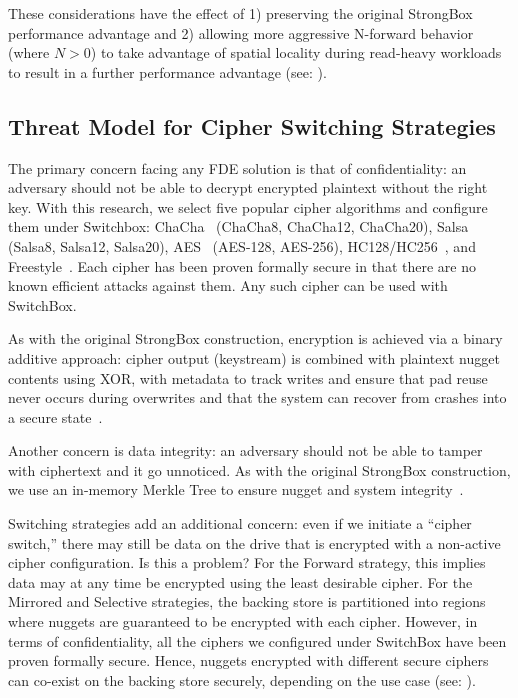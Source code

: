 These considerations have the effect of 1) preserving the original StrongBox
performance advantage and 2) allowing more aggressive N-forward behavior (where
$N > 0$) to take advantage of spatial locality during read-heavy workloads to
result in a further performance advantage (see: ).


\subsection{Threat Model for Cipher Switching Strategies}

The primary concern facing any FDE solution is that of confidentiality: an
adversary should not be able to decrypt encrypted plaintext without the right
key. With this research, we select five popular cipher algorithms and configure
them under Switchbox: ChaCha~\cite{ChaCha20} (ChaCha8, ChaCha12, ChaCha20),
Salsa~\cite{SalsaX} (Salsa8, Salsa12, Salsa20), AES~\cite{AES} (AES-128,
AES-256), HC128/HC256~\cite{HCX}, and Freestyle~\cite{Freestyle}. Each cipher
has been proven formally secure in that there are no known efficient attacks
against them. Any such cipher can be used with SwitchBox.

As with the original StrongBox construction, encryption is achieved via a binary
additive approach: cipher output (keystream) is combined with plaintext nugget
contents using XOR, with metadata to track writes and ensure that pad reuse
never occurs during overwrites and that the system can recover from crashes into
a secure state~\cite{StrongBox}.

Another concern is data integrity: an adversary should not be able to tamper
with ciphertext and it go unnoticed. As with the original StrongBox
construction, we use an in-memory Merkle Tree to ensure nugget and system
integrity~\cite{StrongBox}.

Switching strategies add an additional concern: even if we initiate a ``cipher
switch,'' there may still be data on the drive that is encrypted with a
non-active cipher configuration. Is this a problem? For the Forward strategy,
this implies data may at any time be encrypted using the least desirable cipher.
For the Mirrored and Selective strategies, the backing store is partitioned into
regions where nuggets are guaranteed to be encrypted with each cipher. However,
in terms of confidentiality, all the ciphers we configured under SwitchBox have
been proven formally secure. Hence, nuggets encrypted with different secure
ciphers can co-exist on the backing store securely, depending on the use case
(see: ).

